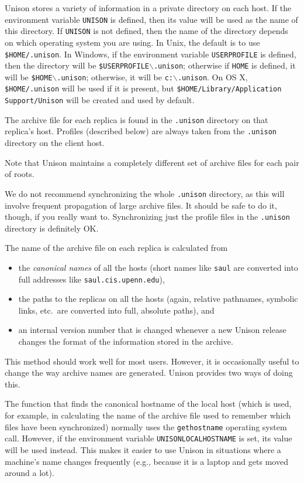 \documentclass{article}
\begin{document}
Unison stores a variety of information in a private directory on each
host.  If the environment variable {\tt UNISON} is defined, then its
value will be used as the name of this directory.  If {\tt UNISON} is
not defined, then the name of the directory depends on which
operating system you are using.  In Unix, the default is to use
{\tt \$HOME/.unison}.
In Windows, if the environment variable
{\tt USERPROFILE} is defined, then the directory will be
{\tt \$USERPROFILE$\backslash$.unison};
otherwise if {\tt HOME} is defined, it will be
{\tt \$HOME$\backslash$.unison};
otherwise, it will be
{\tt c:$\backslash$.unison}.
On OS X,
{\tt \$HOME/.unison} will be used if it is present, but
{\tt \$HOME/Library/Application Support/Unison} will be created and used by
default.

The archive file for each replica is found in the {\tt .unison}
directory on that replica's host.  Profiles (described below) are
always taken from the {\tt .unison} directory on the client host.

Note that Unison maintains a completely different set of archive files
for each pair of roots.

We do not recommend synchronizing the whole {\tt .unison} directory, as this
will involve frequent propagation of large archive files.  It should be safe
to do it, though, if you really want to.  Synchronizing just the profile
files in the {\tt .unison} directory is definitely OK.



The name of the archive file on each replica is calculated from
\begin{itemize}
\item the {\em canonical names} of all the hosts (short names like
  \verb|saul| are converted into full addresses like \verb|saul.cis.upenn.edu|),
\item the paths to the replicas on all the hosts (again, relative
  pathnames, symbolic links, etc.\ are converted into full, absolute paths), and
\item an internal version number that is changed whenever a new Unison
  release changes the format of the information stored in the archive.
\end{itemize}
This method should work well for most users.  However, it is occasionally
useful to change the way archive names are generated.  Unison provides
two ways of doing this.

The function that finds the canonical hostname of the local host (which
is used, for example, in calculating the name of the archive file used to
remember which files have been synchronized) normally uses the
\verb|gethostname| operating system call.  However, if the environment
variable \verb|UNISONLOCALHOSTNAME| is set, its value will be used
instead.  This makes it easier to use Unison in situations where a
machine's name changes frequently (e.g., because it is a laptop and gets
moved around a lot).
\end{document}
